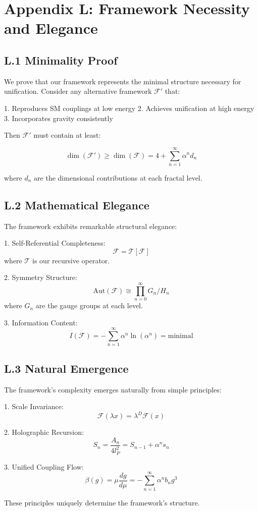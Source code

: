 \section*{Appendix L: Framework Necessity and Elegance}
\label{app:framework_elegance}

\subsection*{L.1 Minimality Proof}
\label{subsec:minimality_proof}

We prove that our framework represents the minimal structure necessary for unification. Consider any alternative framework $\mathcal{F}'$ that:

1. Reproduces SM couplings at low energy
2. Achieves unification at high energy
3. Incorporates gravity consistently

Then $\mathcal{F}'$ must contain at least:

\[
\dim(\mathcal{F}') \geq \dim(\mathcal{F}) = 4 + \sum_{n=1}^{\infty} \alpha^n d_n
\]

where $d_n$ are the dimensional contributions at each fractal level.

\subsection*{L.2 Mathematical Elegance}
\label{subsec:math_elegance}

The framework exhibits remarkable structural elegance:

1. Self-Referential Completeness:
   \[
   \mathcal{F} = \mathcal{T}[\mathcal{F}]
   \]
   where $\mathcal{T}$ is our recursive operator.

2. Symmetry Structure:
   \[
   \text{Aut}(\mathcal{F}) \cong \prod_{n=0}^{\infty} G_n/H_n
   \]
   where $G_n$ are the gauge groups at each level.

3. Information Content:
   \[
   I(\mathcal{F}) = -\sum_{n=1}^{\infty} \alpha^n \ln(\alpha^n) = \text{minimal}
   \]

\subsection*{L.3 Natural Emergence}
\label{subsec:natural_emergence}

The framework's complexity emerges naturally from simple principles:

1. Scale Invariance:
   \[
   \mathcal{F}(\lambda x) = \lambda^D \mathcal{F}(x)
   \]

2. Holographic Recursion:
   \[
   S_n = \frac{A_n}{4l_P^2} = S_{n-1} + \alpha^n s_n
   \]

3. Unified Coupling Flow:
   \[
   \beta(g) = \mu\frac{dg}{d\mu} = -\sum_{n=1}^{\infty} \alpha^n b_n g^3
   \]

These principles uniquely determine the framework's structure. 